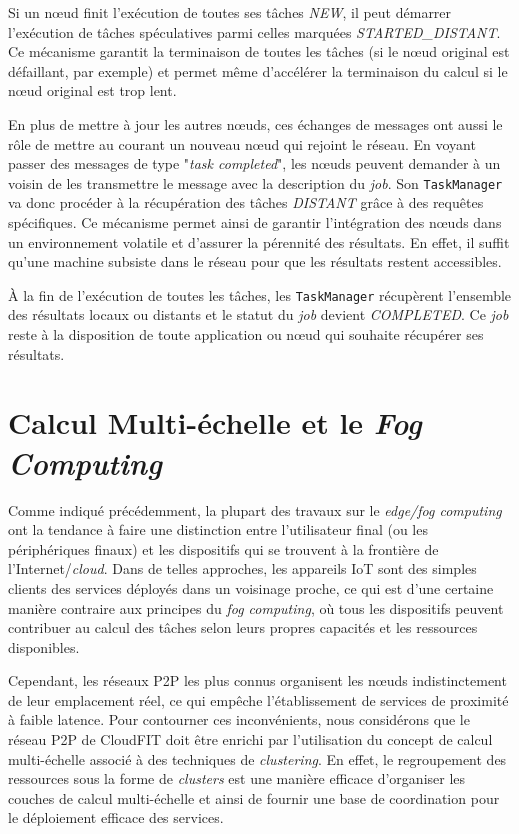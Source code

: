 Si un n{\oe}ud finit l'exécution de toutes ses tâches \textit{NEW}, il peut démarrer l'exécution de tâches spéculatives parmi celles marquées \textit{STARTED\_DISTANT}. Ce mécanisme garantit la terminaison de toutes les tâches (si le n{\oe}ud original est défaillant, par exemple) et permet même d'accélérer la terminaison du calcul si le n{\oe}ud original est trop lent.

En plus de mettre à jour les autres n{\oe}uds, ces échanges de messages ont aussi le rôle de mettre au courant un nouveau n{\oe}ud qui rejoint le réseau. En voyant passer des messages de type "\textit{task completed}", les n{\oe}uds peuvent demander à un voisin de les transmettre le message avec la description du \textit{job}. Son \texttt{TaskManager} va donc procéder à la récupération des tâches \textit{DISTANT} grâce à des requêtes spécifiques. Ce mécanisme permet ainsi de garantir l'intégration des n{\oe}uds dans un environnement volatile et d'assurer la pérennité des résultats. En effet, il suffit qu'une machine subsiste dans le réseau pour que les résultats restent accessibles.

À la fin de l'exécution de toutes les tâches, les \texttt{TaskManager} récupèrent l'ensemble des résultats locaux ou distants et le statut du \textit{job} devient \textit{COMPLETED}. Ce \textit{job} reste à la disposition de toute application ou n{\oe}ud qui souhaite récupérer ses résultats.


\section{Calcul Multi-échelle et le \textit{Fog Computing}\label{sec:multiechelle}}

Comme indiqué précédemment, la plupart des travaux sur le \textit{edge/fog computing} ont la tendance à faire une distinction entre l'utilisateur final (ou les périphériques finaux) et les dispositifs qui se trouvent à la frontière de l'Internet/\textit{cloud}. Dans de telles approches, les appareils IoT sont des simples clients des services déployés dans un voisinage proche, ce qui est d'une certaine manière contraire aux principes du \textit{fog computing}, où tous les dispositifs peuvent contribuer au calcul des tâches selon leurs propres capacités et les ressources disponibles. 

Cependant, les réseaux P2P les plus connus organisent les n{\oe}uds indistinctement de leur emplacement réel, ce qui empêche l'établissement de services de proximité à faible latence. Pour contourner ces inconvénients, nous considérons que le réseau P2P de CloudFIT doit être enrichi par l'utilisation du concept de calcul multi-échelle \cite{Rottenberg2012,Rottenberg2014}  associé à des techniques de \textit{clustering}. En effet, le regroupement des ressources sous la forme de \textit{clusters} est une manière efficace d'organiser les couches de calcul multi-échelle et ainsi de fournir une base de coordination pour le déploiement efficace des services.

